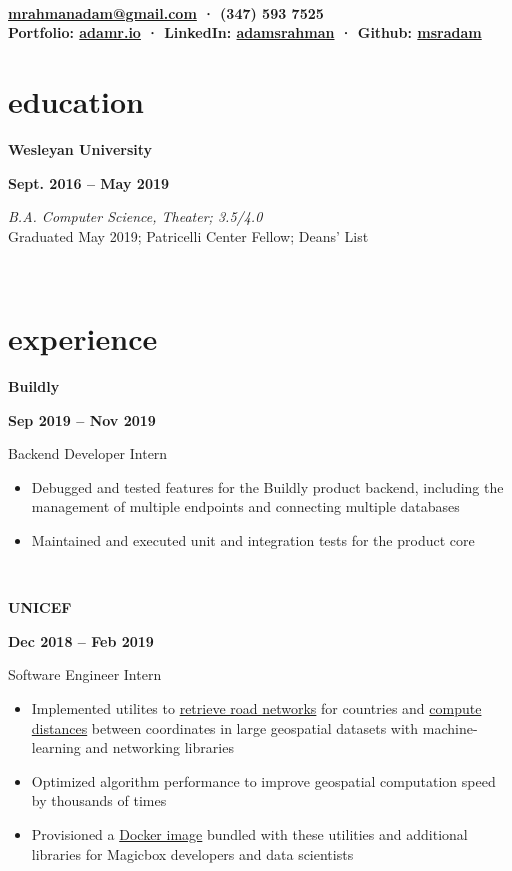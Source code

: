 \documentclass[letterpaper, 11pt]{article}
\author{Adam Rahman}
\makeatletter
\renewcommand{\maketitle}{
	\hspace{.125\textwidth}
	\begin{minipage}[t]{.75\textwidth}
    \begin{center}
        \fontsize{15pt}{15pt}\selectfont\bfseries \theauthor \\
        \fontsize{10pt}{15pt}\selectfont\sf
        \vspace{-0.5mm}
        \href{mailto:mrahmanadam@gmail.com}{mrahmanadam@gmail.com} · (347) 593 7525 \\
        \vspace{-0.5mm}
        Portfolio: \href{http://adamr.io}{adamr.io} · 
        LinkedIn: \href{https://www.linkedin.com/in/adamsrahman/}{adamsrahman} · 
        Github: \href{https://github.com/msradam}{msradam}  \\ 
        \end{center}
    \end{minipage}}
\newcommand{\eduentry}[4]{
        \begin{minipage}[b]{0.5\textwidth}
        \raggedright
        \bf\large #2
        \end{minipage}%
        \begin{minipage}[b]{0.5\textwidth}
        \raggedleft
        \bf #1
        \end{minipage}

    \begin{minipage}[t]{.80\linewidth}
    \vspace{-3mm}
    \textit{#3} \small{#4}
    \end{minipage}\\
    \vspace{1mm}
    }
\newcommand{\expentry}[5]{

    \begin{minipage}[b]{0.5\textwidth}
        \raggedright
        \bf\large #3
        \end{minipage}%
        \begin{minipage}[b]{0.5\textwidth}
        \raggedleft
        \bf {#1} -- {#2}
        \end{minipage}

    \begin{minipage}[t]{\linewidth}
    \vspace{-3mm}
    #4
    \vspace{-2.5mm}
    \small{#5}
    \end{minipage}\\
    \vspace{1mm}
    }
\makeatother
\begin{document}
    \maketitle
    \vspace{.075cm}


    \section{education}
    \eduentry{Sept. 2016 -- May 2019}
    {Wesleyan University}
    {B.A. Computer Science, Theater; 3.5/4.0}
    {\\ Graduated May 2019; Patricelli Center Fellow; Deans' List}

    \section{experience}
    \expentry{Sep 2019}
    {Nov 2019}
    {Buildly}
    {Backend Developer Intern}
    {
        \begin{itemize}
          \setlength\itemsep{0.1mm}
          \item Debugged and tested features for the Buildly product backend, including the management of multiple endpoints and connecting multiple databases
          \item Maintained and executed unit and integration tests for the product core 
        \end{itemize}
        
    }

    \expentry{Dec 2018}
    {Feb 2019}
    {UNICEF}
    {Software Engineer Intern}
    {

        \begin{itemize}{\leftmargin=0.5em \itemindent=0em}
          \setlength\itemsep{0.1mm}
          \item Implemented utilites to \href{https://github.com/unicef/magicbox-download-roads}{retrieve road networks} for countries and \href{https://github.com/msradam/magicbox-site-routing}{compute distances} between coordinates in large geospatial datasets with machine-learning and networking libraries
          \item Optimized algorithm performance to improve geospatial computation speed by thousands of times 
          \item Provisioned a \href{https://hub.docker.com/r/msradam/magicbox-tools}{Docker image} bundled with these utilities and additional libraries for Magicbox developers and data scientists
        \end{itemize}
        
    }
\end{document}
